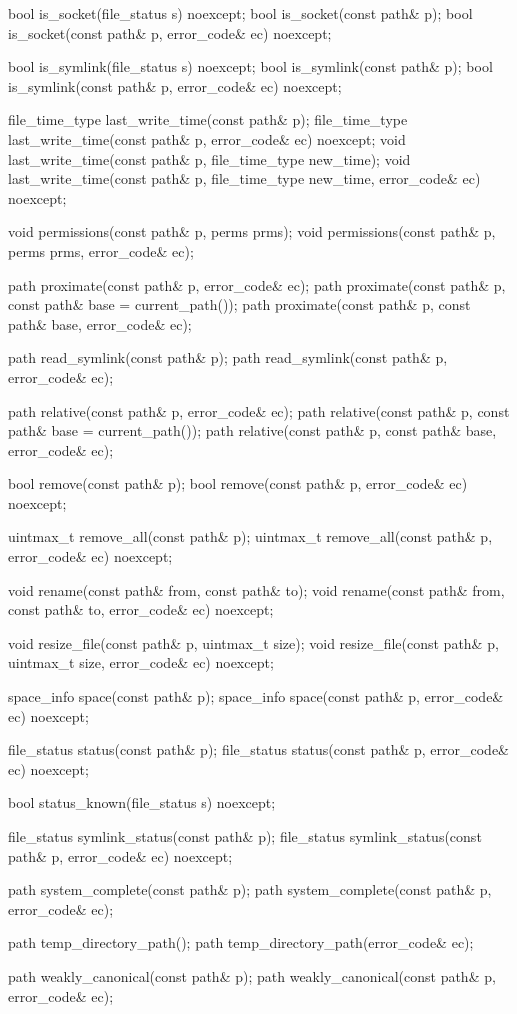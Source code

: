 \begin{codeblock}
{  bool is_socket(file_status s) noexcept;
  bool is_socket(const path& p);
  bool is_socket(const path& p, error_code& ec) noexcept;

  bool is_symlink(file_status s) noexcept;
  bool is_symlink(const path& p);
  bool is_symlink(const path& p, error_code& ec) noexcept;

  file_time_type last_write_time(const path& p);
  file_time_type last_write_time(const path& p, error_code& ec) noexcept;
  void last_write_time(const path& p, file_time_type new_time);
  void last_write_time(const path& p, file_time_type new_time,
                       error_code& ec) noexcept;

  void permissions(const path& p, perms prms);
  void permissions(const path& p, perms prms, error_code& ec);

  path proximate(const path& p, error_code& ec);
  path proximate(const path& p, const path& base = current_path());
  path proximate(const path& p, const path& base, error_code& ec);

  path read_symlink(const path& p);
  path read_symlink(const path& p, error_code& ec);

  path relative(const path& p, error_code& ec);
  path relative(const path& p, const path& base = current_path());
  path relative(const path& p, const path& base, error_code& ec);

  bool remove(const path& p);
  bool remove(const path& p, error_code& ec) noexcept;

  uintmax_t remove_all(const path& p);
  uintmax_t remove_all(const path& p, error_code& ec) noexcept;

  void rename(const path& from, const path& to);
  void rename(const path& from, const path& to, error_code& ec) noexcept;

  void resize_file(const path& p, uintmax_t size);
  void resize_file(const path& p, uintmax_t size, error_code& ec) noexcept;

  space_info space(const path& p);
  space_info space(const path& p, error_code& ec) noexcept;

  file_status status(const path& p);
  file_status status(const path& p, error_code& ec) noexcept;

  bool status_known(file_status s) noexcept;

  file_status symlink_status(const path& p);
  file_status symlink_status(const path& p, error_code& ec) noexcept;

  path system_complete(const path& p);
  path system_complete(const path& p, error_code& ec);

  path temp_directory_path();
  path temp_directory_path(error_code& ec);

  path weakly_canonical(const path& p);
  path weakly_canonical(const path& p, error_code& ec);
}
\end{codeblock}


